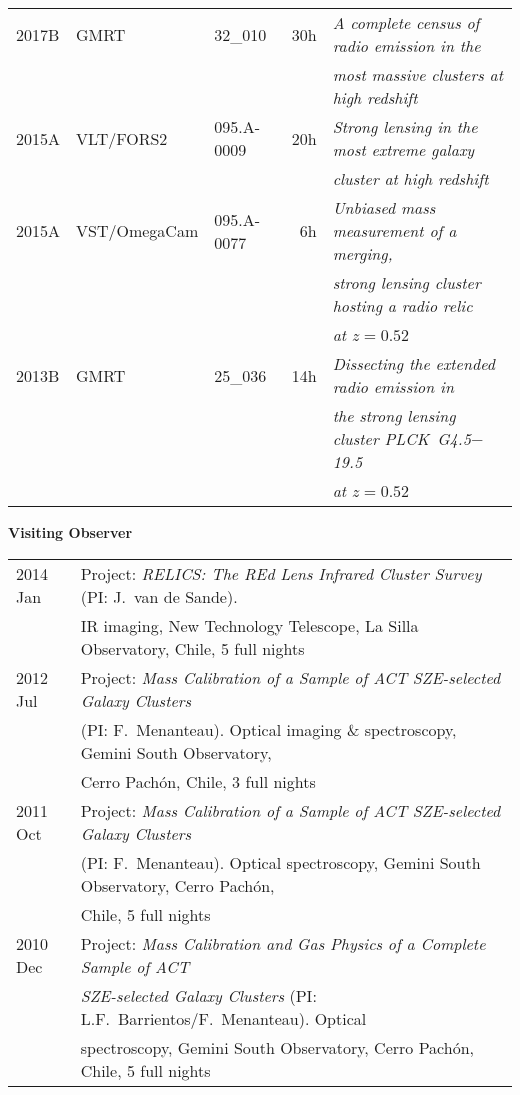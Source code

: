 \documentclass[11pt]{article}
\begin{document}
\begin{table}[h!]
\begin{tabular}{l l l r l}
2017B & GMRT          & 32\_010    & 30h & {\it A complete census of radio emission in the}\\
      &               &            &     & {\it most massive clusters at high redshift}\\
2015A & VLT/FORS2     & 095.A-0009 & 20h & {\it Strong lensing in the most extreme galaxy}\\
      &               &            &     & {\it cluster at high redshift}\\
2015A & VST/OmegaCam  & 095.A-0077 & 6h  & {\it Unbiased mass measurement of a merging,}\\
      &               &            &     & {\it strong lensing cluster hosting a radio relic}\\
      &               &            &     & {\it at $z=0.52$}\\
2013B & GMRT          & 25\_036    & 14h & {\it Dissecting the extended radio emission in}\\
      &               &            &     & {\it the strong lensing cluster PLCK~G4.5$-$19.5}\\
      &               &            &     & {\it at $z=0.52$}
\end{tabular}
\end{table}


\noindent
{\bf\Large Visiting Observer}\\
\vspace{-0.2cm}

\begin{table}[h!]
\begin{tabular}{l l}
2014 Jan & Project: {\it RELICS: The REd Lens Infrared Cluster Survey} (PI: J.~van de Sande).\\
         & IR imaging, New Technology Telescope, La Silla Observatory, Chile, 5 full nights\\
2012 Jul & Project: {\it Mass Calibration of a Sample of ACT SZE-selected Galaxy Clusters}\\
         & (PI: F.~Menanteau). Optical imaging \& spectroscopy, Gemini South Observatory,\\
         & Cerro Pach\'on, Chile, 3 full nights\\
2011 Oct & Project: {\it Mass Calibration of a Sample of ACT SZE-selected Galaxy Clusters}\\
         & (PI: F.~Menanteau). Optical spectroscopy, Gemini South Observatory, Cerro Pach\'on,\\
         & Chile, 5 full nights\\
2010 Dec & Project: {\it Mass Calibration and Gas Physics of a Complete Sample of ACT}\\
         & {\it SZE-selected Galaxy Clusters} (PI: L.F.~Barrientos/F.~Menanteau). Optical\\
         & spectroscopy, Gemini South Observatory, Cerro Pach\'on, Chile, 5 full nights\\
\end{tabular}
\end{table}
\end{document}
